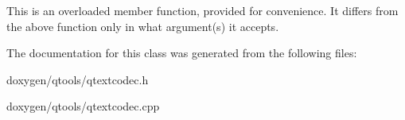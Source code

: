 This is an overloaded member function, provided for convenience. It differs from the above function only in what argument(s) it accepts.

The documentation for this class was generated from the following files\+:\begin{DoxyCompactItemize}
\item 
doxygen/qtools/qtextcodec.\+h\item 
doxygen/qtools/qtextcodec.\+cpp\end{DoxyCompactItemize}
